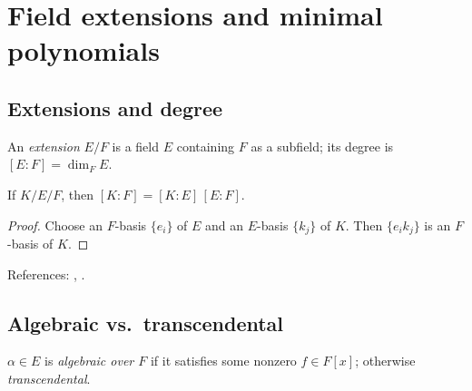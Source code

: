 \section{Field extensions and minimal polynomials}\label{sec:extensions-minimal}

\subsection{Extensions and degree}
\begin{definition}
An \emph{extension} $E/F$ is a field $E$ containing $F$ as a subfield; its degree is $[E\!:\!F]=\dim_F E$.
\end{definition}
\begin{theorem}\label{thm:tower}
If $K/E/F$, then $[K\!:\!F]=[K\!:\!E]\,[E\!:\!F]$.
\end{theorem}
\begin{proof}
Choose an $F$-basis $\{e_i\}$ of $E$ and an $E$-basis $\{k_j\}$ of $K$. Then $\{e_i k_j\}$ is an $F$-basis of $K$.
\end{proof}
References: \cite[\S13]{DF}, \cite[Ch.~V]{Artin}.

\subsection{Algebraic vs.\ transcendental}
\begin{definition}
$\alpha\in E$ is \emph{algebraic over $F$} if it satisfies some nonzero $f\in F[x]$; otherwise \emph{transcendental}.
\end{definition}

